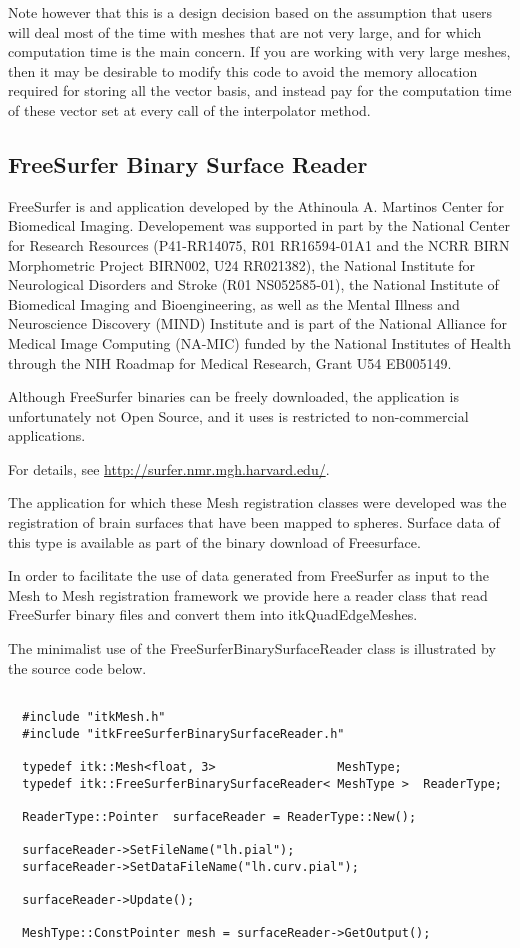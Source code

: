 \documentclass{InsightArticle}
\begin{document}
Note however that this is a design decision based on the assumption that users
will deal most of the time with meshes that are not very large, and for which
computation time is the main concern. If you are working with very large
meshes, then it may be desirable to modify this code to avoid the memory
allocation required for storing all the vector basis, and instead pay for the
computation time of these vector set at every call of the interpolator
 method.

\subsection{FreeSurfer Binary Surface Reader}

FreeSurfer is and application developed by the Athinoula A. Martinos Center for
Biomedical Imaging. Developement was supported in part by the National Center
for Research Resources (P41-RR14075, R01 RR16594-01A1 and the NCRR BIRN
Morphometric Project BIRN002, U24 RR021382), the National Institute for
Neurological Disorders and Stroke (R01 NS052585-01), the National Institute of
Biomedical Imaging and Bioengineering, as well as the Mental Illness and
Neuroscience Discovery (MIND) Institute and is part of the National Alliance
for Medical Image Computing (NA-MIC) funded by the National Institutes of
Health through the NIH Roadmap for Medical Research, Grant U54 EB005149. 

Although FreeSurfer binaries can be freely downloaded, the application is
unfortunately not Open Source, and it uses is restricted to non-commercial
applications.

For details, see \url{http://surfer.nmr.mgh.harvard.edu/}.

The application for which these Mesh registration classes were developed was
the registration of brain surfaces that have been mapped to spheres. Surface 
data of this type is available as part of the binary download of Freesurface.

In order to facilitate the use of data generated from FreeSurfer as input to
the Mesh to Mesh registration framework we provide here a reader class that
read FreeSurfer binary files and convert them into itkQuadEdgeMeshes.

The minimalist use of the FreeSurferBinarySurfaceReader class is illustrated by
the source code below.


\begin{lstlisting}

  #include "itkMesh.h"
  #include "itkFreeSurferBinarySurfaceReader.h"

  typedef itk::Mesh<float, 3>                 MeshType;
  typedef itk::FreeSurferBinarySurfaceReader< MeshType >  ReaderType;

  ReaderType::Pointer  surfaceReader = ReaderType::New();

  surfaceReader->SetFileName("lh.pial");
  surfaceReader->SetDataFileName("lh.curv.pial");
  
  surfaceReader->Update();

  MeshType::ConstPointer mesh = surfaceReader->GetOutput();

\end{lstlisting}
\end{document}
